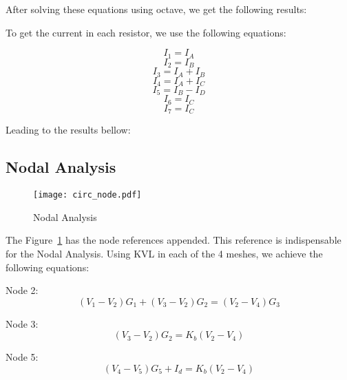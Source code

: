 \vspace{0.5cm}

After solving these equations using octave, we get 
the following results:

\vspace{0.5cm}


\vspace{0.5cm}

To get the current in each resistor, we use the following equations:

\vspace{0.5cm}

$$ I_1 = I_A $$
$$ I_2 = I_B $$
$$ I_3 = I_A + I_B $$
$$ I_4 = I_A + I_C $$
$$ I_5 = I_B - I_D $$
$$ I_6 = I_C $$
$$ I_7 = I_C $$

\vspace{0.5cm}

Leading to the results bellow:

\vspace{0.5cm}


\vspace{1.0cm}

\newpage

\subsection{Nodal Analysis}

\vspace{0.5cm}

\begin{figure}[h!] \centering
	\texttt{[image: circ\_node.pdf]}
	\caption{Nodal Analysis}
	\label{fig:circuitNodes}
\end{figure}

\vspace{0.5cm}

The Figure~\ref{fig:circuitNodes} has the node references appended.
This reference is indispensable for the Nodal Analysis.
Using KVL in each of the 4 meshes, we achieve the following equations:

\vspace{0.5cm}

Node 2:
$$ (V_1 - V_2)G_1 + (V_3 - V_2)G_2 = (V_2 - V_4)G_3 $$

Node 3:
$$ (V_3 - V_2)G_2 = K_b(V_2 - V_4) $$

Node 5:
$$ (V_4 - V_5)G_5 + I_d = K_b(V_2 - V_4) $$

